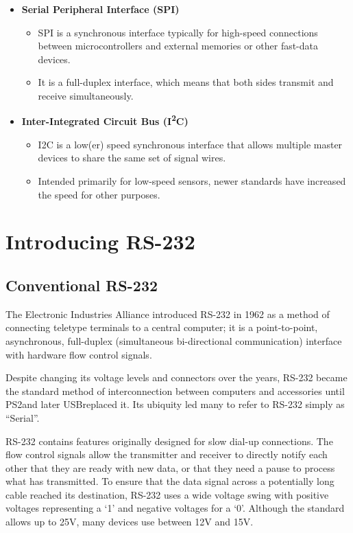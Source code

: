 \documentclass[openany,11pt,fleqn]{book} %
\begin{document}
\begin{itemize}
    \item \textbf{Serial Peripheral Interface (SPI)}
    \begin{itemize}
        \item SPI is a synchronous interface typically for high-speed connections between microcontrollers and external memories or other fast-data devices.
        \item It is a full-duplex interface, which means that both sides transmit and receive simultaneously.
    \end{itemize}
    \item \textbf{Inter-Integrated Circuit Bus (I\textsuperscript{2}C)}
    \begin{itemize}
        \item I2C is a low(er) speed synchronous interface that allows multiple master devices to share the same set of signal wires. 
        \item Intended primarily for low-speed sensors, newer standards have increased the speed for other purposes.
    \end{itemize}
\end{itemize}



\section{Introducing RS-232}
\subsection{Conventional RS-232}
The Electronic Industries Alliance introduced RS-232 in 1962 as a method of connecting teletype terminals to a central computer; it is a point-to-point, asynchronous, full-duplex (simultaneous bi-directional communication) interface with hardware flow control signals. 

Despite changing its voltage levels and connectors over the years, RS-232 became the standard method of interconnection between computers and accessories until PS2\textemdash and later USB\textemdash replaced it. Its ubiquity led many to refer to RS-232 simply as ``Serial''. 

RS-232 contains features originally designed for slow dial-up connections. The flow control signals allow the transmitter and receiver to directly notify each other that they are ready with new data, or that they need a pause to process what has transmitted. To ensure that the data signal across a potentially long cable reached its destination, RS-232 uses a wide voltage swing with positive voltages representing a `1' and negative voltages for a `0'. Although the standard allows up to {\textpm}25V, many devices use between {\textpm}12V and {\textpm}15V.
\end{document}
